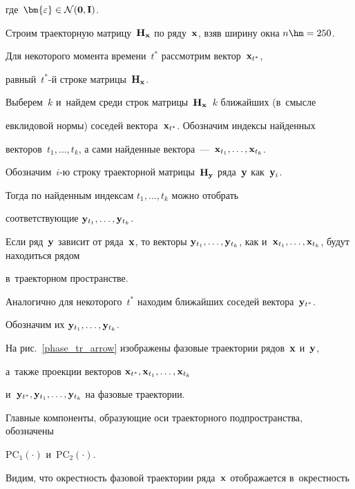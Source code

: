 \vspace*{-2pt}



\noindent

где~$\bm{\varepsilon} \in \mathcal{N}(\bold{0}, \bI)$.  



Строим траекторную матрицу~$\mathbf{H}_{\mathbf{x}}$ по ряду~$\mathbf{x}$, взяв ширину окна $n\hm =  250$.

Для некоторого момента времени~$t^*$ рассмотрим вектор~$\mathbf{x}_{t^*}$, 

равный~$t^*$-й строке матрицы~$\mathbf{H}_{\mathbf{x}}$.

Выберем~$k$ и~найдем среди строк матрицы~$\mathbf{H}_{\mathbf{x}}$~$k$ ближайших (в~смысле 

евклидовой нормы) соседей вектора~$\mathbf{x}_{t^*}$. Обозначим индексы найденных 

векторов~$t_1, \ldots, t_k$, а сами найденные вектора~---~$\bx_{t_1}, \ldots, 

\bx_{t_k}$.

Обозначим~$i$-ю строку траекторной мат\-ри\-цы~$\mathbf{H}_{\mathbf{y}}$ ряда~$\mathbf{y}$ как~$\mathbf{y}_{i}$. 

Тогда по найденным индексам $t_1, \ldots, t_{k}$ можно отобрать 

соответствующие $\mathbf{y}_{t_1}, \ldots, \mathbf{y}_{t_{k}}$.

Если ряд~$\by$ зависит от ряда~$\bx$, то векторы $\by_{t_1}, \ldots, 

\by_{t_{k}}$, как и~$\bx_{t_1}, \ldots, \bx_{t_{k}}$,  будут находиться рядом 

в~траекторном пространстве.



Аналогично для некоторого~$t^*$ находим ближайших соседей вектора~$\mathbf{y}_{t^*}$.

Обозначим их $\mathbf{y}_{t_1}, \ldots, \mathbf{y}_{t_k}$.

На рис.~\ref{phase_tr_arrow} изображены фазовые траектории рядов~$\mathbf{x}$ и~$\mathbf{y}$, 

а~также проекции векторов $\mathbf{x}_{t^*}, \mathbf{x}_{t_1}, \ldots, \mathbf{x}_{t_{k}}$ 

и~$\mathbf{y}_{t^*}, \mathbf{y}_{t_1}, \ldots, \mathbf{y}_{t_{k}}$ на фазовые траектории.

Главные компоненты, образующие оси траекторного подпространства, обозначены

$\mathrm{PC}_1(\cdot)$ и~$\mathrm{PC}_2(\cdot)$.





Видим, что окрестность фазовой траектории ряда~$\mathbf{x}$ отображается в~окрестность 

